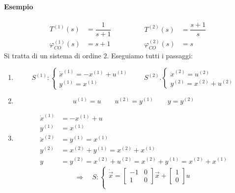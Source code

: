 \documentclass[../main.tex]{subfiles}
\begin{document}
		\paragraph{Esempio}
			\[
				\begin{aligned}
					T^{(1)}(s) &= \dfrac{1}{s+1}\\
					\varphi_{CO}^{(1)}(s) &= s+1
				\end{aligned}
				\qquad\qquad
				\begin{aligned}
					T^{(2)}(s) &= \dfrac{s+1}{s}\\
					\varphi_{CO}^{(2)}(s) &= s
				\end{aligned}
			\]
			Si tratta di un sistema di ordine 2. Eseguiamo tutti i passaggi:
			\begin{enumerate}
				\item 
					\[
						S^{(1)}:
						\begin{cases}
							\dot x^{(1)} = -x^{(1)} + u^{(1)}\\
							y^{(1)} = x^{(1)}
						\end{cases}
						\qquad
						S^{(2)}.
						\begin{cases}
							\dot x^{(2)} = u^{(2)}\\
							y^{(2)} = x^{(2)} + u^{(2)}
						\end{cases}
					\]
				\item 
					\[
						u^{(1)} = u \qquad u^{(2)} = y^{(1)} \qquad y = y^{(2)}
					\]
				\item 
					\[
						\begin{aligned}
							\dot x^{(1)} &= -x^{(1)} + u\\
							y^{(1)} &= x^{(1)}\\
							\dot x^{(2)} &= y^{(1)} = x^{(1)}\\
							y^{(2)} &= x^{(2)} + y^{(1)} = x^{(2)} + x^{(1)}\\
							y &= y^{(2)} = x^{(2)} + u^{(2)} = x^{(2)} + y^{(1)} = x^{(2)} + x^{(1)}
						\end{aligned}
					\]
					\[
						\Rightarrow\quad S:
						\begin{cases}
							\dot{\vec x} =
							\begin{bmatrix}
								-1 & 0\\
								1 & 0
							\end{bmatrix} \vec x +
							\begin{bmatrix}
								1\\
								0
							\end{bmatrix} u
							\\

\end{cases}\]
\end{enumerate}
\end{document}
